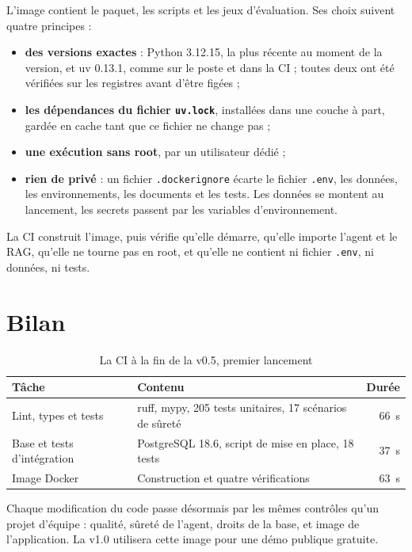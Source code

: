 \documentclass[11pt,a4paper]{article}
\begin{document}
L'image contient le paquet, les scripts et les jeux d'évaluation. Ses choix suivent quatre principes :
\begin{itemize}
  \item \textbf{des versions exactes} : Python 3.12.15, la plus récente au moment de la version, et uv 0.13.1, comme sur le poste et dans la CI ; toutes deux ont été vérifiées sur les registres avant d'être figées ;
  \item \textbf{les dépendances du fichier \texttt{uv.lock}}, installées dans une couche à part, gardée en cache tant que ce fichier ne change pas ;
  \item \textbf{une exécution sans root}, par un utilisateur dédié ;
  \item \textbf{rien de privé} : un fichier \texttt{.dockerignore} écarte le fichier \texttt{.env}, les données, les environnements, les documents et les tests. Les données se montent au lancement, les secrets passent par les variables d'environnement.
\end{itemize}

La CI construit l'image, puis vérifie qu'elle démarre, qu'elle importe l'agent et le RAG, qu'elle ne tourne pas en root, et qu'elle ne contient ni fichier \texttt{.env}, ni données, ni tests.

\section{Bilan}

\begin{table}[H]
\centering\small
\begin{tabularx}{\linewidth}{@{}l Y r@{}}
\toprule
Tâche & Contenu & Durée \\
\midrule
Lint, types et tests & ruff, mypy, 205 tests unitaires, 17 scénarios de sûreté & 66~s \\
Base et tests d'intégration & PostgreSQL 18.6, script de mise en place, 18 tests & 37~s \\
Image Docker & Construction et quatre vérifications & 63~s \\
\bottomrule
\end{tabularx}
\caption{La CI à la fin de la v0.5, premier lancement}
\end{table}

Chaque modification du code passe désormais par les mêmes contrôles qu'un projet d'équipe : qualité, sûreté de l'agent, droits de la base, et image de l'application. La v1.0 utilisera cette image pour une démo publique gratuite.
\end{document}
